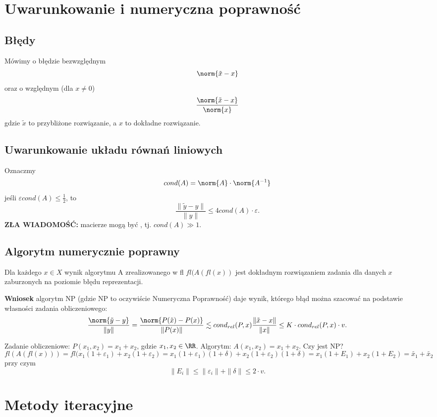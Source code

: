 \section{Uwarunkowanie i numeryczna poprawność}
\subsection{Błędy}
Mówimy o błędzie bezwzględnym
$$
\norm{\tilde{x} - x}
$$
oraz o względnym (dla $x\neq 0$)
$$
\frac{\norm{\tilde{x} - x}}{\norm{x}}
$$
gdzie $\tilde{x}$ to przybliżone rozwiązanie, a $x$ to dokładne rozwiązanie.
\subsection{Uwarunkowanie układu równań liniowych}
Oznaczmy
$$
cond(A)= \norm{A}\cdot \norm{A^{-1}}
$$
jeśli $\varepsilon cond(A) \le \frac{1}{2}$, to
$$
\frac{\|\tilde{y}-y\|}{\|y\|} \le 4 cond(A)\cdot \varepsilon.
$$
\textbf{ZŁA WIADOMOŚĆ:} macierze mogą być , tj. $cond(A) \gg 1$.
\subsection{Algorytm numerycznie poprawny}
Dla każdego $x\in X$ wynik algorytmu A zrealizowanego w fl
$fl(A(fl(x))$ jest dokładnym rozwiązaniem zadania dla danych $x$
zaburzonych na poziomie błędu reprezentacji.

\textbf{Wniosek} algorytm NP (gdzie NP to oczywiście Numeryczna Poprawność) daje wynik, którego błąd można szacować na podstawie własności zadania obliczeniowego:
$$
\frac{\norm{\tilde{y} - y}}{\|y\|} = \frac{\norm{P(\tilde{x})-P(x)}}{\|P(x)\|} \lesssim cond_{rel}(P,x)\frac{\|\tilde{x}-x\|}{\|x\|} \le K\cdot cond_{rel}(P,x)\cdot v.
$$
\begin{example}
    Zadanie obliczeniowe: $P(x_1,x_2)=x_1+x_2$, gdzie $x_1,x_2\in\RR$.\newline
    Algorytm: $A(x_1,x_2)=x_1+x_2$. \newline
    Czy jest NP?
    $$
    fl(A(fl(x))) = fl(x_1(1+\varepsilon_1)+x_2(1+\varepsilon_2) = x_1(1+\varepsilon_1)(1+\delta)+x_2(1+\varepsilon_2)(1+\delta) = x_1(1+E_1) + x_2(1+E_2)=\tilde{x_1}+\tilde{x_2}
    $$
    przy czym
    $$
\|E_i\|\le \|\varepsilon_i\| + \|\delta\| \le 2\cdot v.
    $$
\end{example}

\section{Metody iteracyjne}

